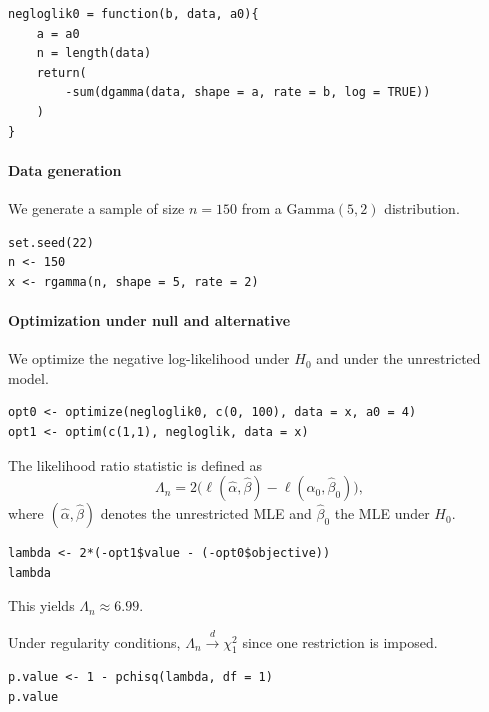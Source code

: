 \begin{verbatim}
negloglik0 = function(b, data, a0){
    a = a0
    n = length(data)
    return(
        -sum(dgamma(data, shape = a, rate = b, log = TRUE))
    )
}
\end{verbatim}

\paragraph{Data generation}%
We generate a sample of size $n=150$ from a $\mathrm{Gamma}(5,2)$ distribution.

\begin{verbatim}
set.seed(22)
n <- 150
x <- rgamma(n, shape = 5, rate = 2)
\end{verbatim}

\paragraph{Optimization under null and alternative}%

We optimize the negative log-likelihood under $H_0$ and under the unrestricted model.

\begin{verbatim}
opt0 <- optimize(negloglik0, c(0, 100), data = x, a0 = 4)
opt1 <- optim(c(1,1), negloglik, data = x)
\end{verbatim}

\begin{definition}
The likelihood ratio statistic is defined as
\begin{equation*}
\Lambda_n
=
2\bigl(\ell(\hat{\alpha},\hat{\beta}) - \ell(\alpha_0,\hat{\beta}_0)\bigr),
\end{equation*}
where $(\hat{\alpha},\hat{\beta})$ denotes the unrestricted MLE and $\hat{\beta}_0$ the MLE under $H_0$.
\end{definition}

\begin{verbatim}
lambda <- 2*(-opt1$value - (-opt0$objective))
lambda
\end{verbatim}

This yields $\Lambda_n \approx 6.99$.

%

Under regularity conditions, $\Lambda_n \xrightarrow{d} \chi^2_1$ since one restriction is imposed.

\begin{verbatim}
p.value <- 1 - pchisq(lambda, df = 1)
p.value
\end{verbatim}


